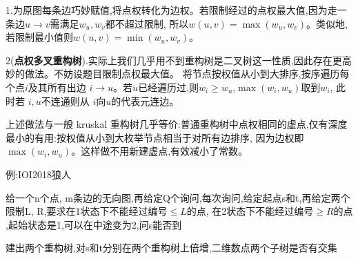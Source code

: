 \documentclass[a4paper, fontset=none]{ctexart}
\begin{document}
1.为原图每条边巧妙赋值,将点权转化为边权。若限制经过的点权最大值,因为走一条边$u\rightarrow v$需满足$w_u, w_v$都不超过限制,
所以$w(u, v)=\max(w_u, w_v)$。类似地,若限制最小值则$w(u, v)=\min(w_u, w_v)$。

2(\textbf{点权多叉重构树}).实际上我们几乎用不到重构树是二叉树这一性质,因此存在更高妙的做法。不妨设题目限制点权最大值。
将节点按权值从小到大排序,按序遍历每个点$i$及其所有出边 $i\rightarrow u$。若$u$已经遍历过,则$w_i\ge w_u$,$\max(w_i, w_u)$取到$w_i$,
此时若 $i, u$不连通则从 $i$向$u$的代表元连边。

上述做法与一般 kruskal 重构树几乎等价:普通重构树中点权相同的虚点,仅有深度最小的有用:按权值从小到大枚举节点相当于对所有边排序,
因为边权即 $\max(w_i, w_u)$。这样做不用新建虚点,有效减小了常数。

例:IOI2018狼人

给一个n个点, m条边的无向图,再给定Q个询问,每次询问,给定起点s和t,再给定两个限制L, R,要求在1状态下不能经过编号$\leqslant L$的点,
在2状态下不能经过编号$\ge R$的点 ,起始状态是1,可以在中途变为2,问s能否到

建出两个重构树,对s和t分别在两个重构树上倍增,二维数点两个子树是否有交集
\end{document}
